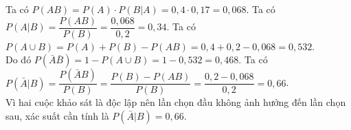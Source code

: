 \begin{ex}
{       \begin{itemchoice}
           \itemch 
           Ta có $P(AB)=P(A)\cdot P\left(B|A\right)=0{,}4\cdot 0{,}17=0{,}068$.
           \itemch Ta có $P\left(A|B\right)=\dfrac{P(AB)}{P(B)}=\dfrac{0{,}068}{0{,}2}=0{,}34$.
           \itemch Ta có $P\left(A\cup B\right)=P(A)+P(B)-P(AB)=0{,}4+0{,}2-0{,}068=0{,}532$.\\
           Do đó $P\left(\bar{A}\bar{B}\right)=1-P\left(A\cup B\right)=1-0{,}532=0{,}468$.
           \itemch Ta có $P\left(\bar{A}|B\right)=\dfrac{P\left(\bar{A}B\right)}{P(B)}=\dfrac{P(B)-P(AB)}{P(B)}=\dfrac{0{,}2-0{,}068}{0{,}2}=0{,}66$.\\
           Vì hai cuộc khảo sát là độc lập nên lần chọn đầu không ảnh hưởng đến lần chọn sau, xác suất cần tính là $P\left(\bar{A}|B\right)=0{,}66$.
       \end{itemchoice}
   }
\end{ex}

